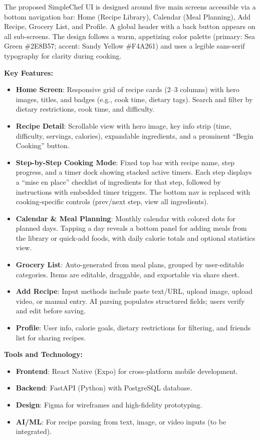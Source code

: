 The proposed SimpleChef UI is designed around five main screens accessible via a bottom navigation bar: Home (Recipe Library), Calendar (Meal Planning), Add Recipe, Grocery List, and Profile. A global header with a back button appears on all sub-screens. The design follows a warm, appetizing color palette (primary: Sea Green \#2E8B57; accent: Sandy Yellow \#F4A261) and uses a legible sans-serif typography for clarity during cooking.

\textbf{Key Features:}
\begin{itemize}
  \item \textbf{Home Screen}: Responsive grid of recipe cards (2--3 columns) with hero images, titles, and badges (e.g., cook time, dietary tags). Search and filter by dietary restrictions, cook time, and difficulty.
  \item \textbf{Recipe Detail}: Scrollable view with hero image, key info strip (time, difficulty, servings, calories), expandable ingredients, and a prominent ``Begin Cooking'' button.
  \item \textbf{Step-by-Step Cooking Mode}: Fixed top bar with recipe name, step progress, and a timer dock showing stacked active timers. Each step displays a ``mise en place'' checklist of ingredients for that step, followed by instructions with embedded timer triggers. The bottom nav is replaced with cooking-specific controls (prev/next step, view all ingredients).
  \item \textbf{Calendar \& Meal Planning}: Monthly calendar with colored dots for planned days. Tapping a day reveals a bottom panel for adding meals from the library or quick-add foods, with daily calorie totals and optional statistics view.
  \item \textbf{Grocery List}: Auto-generated from meal plans, grouped by user-editable categories. Items are editable, draggable, and exportable via share sheet.
  \item \textbf{Add Recipe}: Input methods include paste text/URL, upload image, upload video, or manual entry. AI parsing populates structured fields; users verify and edit before saving.
  \item \textbf{Profile}: User info, calorie goals, dietary restrictions for filtering, and friends list for sharing recipes.
\end{itemize}

\textbf{Tools and Technology:}
\begin{itemize}
  \item \textbf{Frontend}: React Native (Expo) for cross-platform mobile development.
  \item \textbf{Backend}: FastAPI (Python) with PostgreSQL database.
  \item \textbf{Design}: Figma for wireframes and high-fidelity prototyping.
  \item \textbf{AI/ML}: For recipe parsing from text, image, or video inputs (to be integrated).
\end{itemize}


